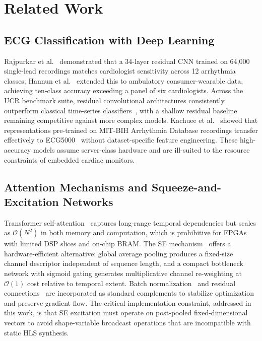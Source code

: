\documentclass[12pt, letterpaper]{article}
\begin{document}
\section{Related Work}
\label{sec:related}

\subsection{ECG Classification with Deep Learning}

Rajpurkar et al.~\cite{Rajpurkar2017} demonstrated that a 34-layer
residual CNN trained on 64,000 single-lead recordings matches cardiologist
sensitivity across 12 arrhythmia classes;
Hannun et al.~\cite{Hannun2019}
extended this to ambulatory consumer-wearable data, achieving ten-class
accuracy exceeding a panel of six cardiologists.
Across the UCR benchmark
suite, residual convolutional architectures consistently outperform
classical time-series classifiers~\cite{IsmailFawaz2019}, with a shallow
residual baseline~\cite{Wang2017} remaining competitive against more
complex models.
Kachuee et al.~\cite{Kachuee2018} showed that
representations pre-trained on MIT-BIH Arrhythmia Database recordings
transfer effectively to ECG5000~\cite{Dau2019} without dataset-specific
feature engineering.
These high-accuracy models assume server-class
hardware and are ill-suited to the resource constraints of embedded
cardiac monitors.
\subsection{Attention Mechanisms and Squeeze-and-Excitation Networks}

Transformer self-attention~\cite{Vaswani2017} captures long-range
temporal dependencies but scales as $\mathcal{O}(N^2)$ in both memory
and computation, which is prohibitive for FPGAs with limited DSP slices
and on-chip BRAM.
The SE mechanism~\cite{Hu2018} offers a
hardware-efficient alternative: global average pooling produces a
fixed-size channel descriptor independent of sequence length, and a
compact bottleneck network with sigmoid gating generates multiplicative
channel re-weighting at $\mathcal{O}(1)$ cost relative to temporal
extent.
Batch normalization~\cite{Ioffe2015} and residual
connections~\cite{He2016} are incorporated as standard complements to
stabilize optimization and preserve gradient flow.
The critical
implementation constraint, addressed in this work, is that SE excitation
must operate on post-pooled fixed-dimensional vectors to avoid
shape-variable broadcast operations that are incompatible with static HLS
synthesis.
\end{document}
